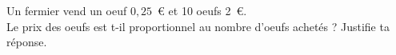 Un fermier vend un oeuf $0,25$~\textgreek{\euro} et 10 oeufs 2~\textgreek{\euro}.
\\Le prix des oeufs est t-il proportionnel au nombre d'oeufs achetés ? Justifie ta réponse.